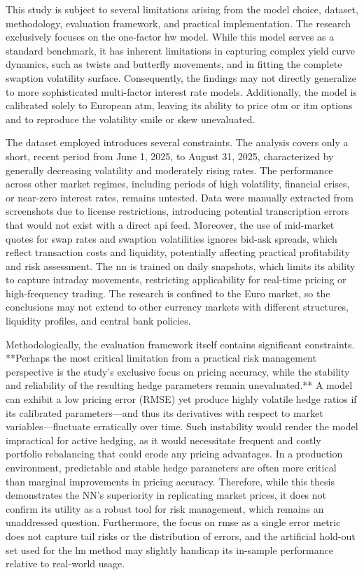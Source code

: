 This study is subject to several limitations arising from the model choice, dataset, methodology, evaluation framework, and practical implementation. The research exclusively focuses on the one-factor \ac{hw} model. While this model serves as a standard benchmark, it has inherent limitations in capturing complex yield curve dynamics, such as twists and butterfly movements, and in fitting the complete swaption volatility surface. Consequently, the findings may not directly generalize to more sophisticated multi-factor interest rate models. Additionally, the model is calibrated solely to European \ac{atm}, leaving its ability to price \ac{otm} or \ac{itm} options and to reproduce the volatility smile or skew unevaluated.

The dataset employed introduces several constraints. The analysis covers only a short, recent period from June 1, 2025, to August 31, 2025, characterized by generally decreasing volatility and moderately rising rates. The performance across other market regimes, including periods of high volatility, financial crises, or near-zero interest rates, remains untested. Data were manually extracted from screenshots due to license restrictions, introducing potential transcription errors that would not exist with a direct \ac{api} feed. Moreover, the use of mid-market quotes for swap rates and swaption volatilities ignores bid-ask spreads, which reflect transaction costs and liquidity, potentially affecting practical profitability and risk assessment. The \ac{nn} is trained on daily snapshots, which limits its ability to capture intraday movements, restricting applicability for real-time pricing or high-frequency trading. The research is confined to the Euro market, so the conclusions may not extend to other currency markets with different structures, liquidity profiles, and central bank policies.

Methodologically, the evaluation framework itself contains significant constraints. **Perhaps the most critical limitation from a practical risk management perspective is the study's exclusive focus on pricing accuracy, while the stability and reliability of the resulting hedge parameters remain unevaluated.** A model can exhibit a low pricing error (RMSE) yet produce highly volatile hedge ratios if its calibrated parameters—and thus its derivatives with respect to market variables—fluctuate erratically over time. Such instability would render the model impractical for active hedging, as it would necessitate frequent and costly portfolio rebalancing that could erode any pricing advantages. In a production environment, predictable and stable hedge parameters are often more critical than marginal improvements in pricing accuracy. Therefore, while this thesis demonstrates the NN's superiority in replicating market prices, it does not confirm its utility as a robust tool for risk management, which remains an unaddressed question. Furthermore, the focus on \ac{rmse} as a single error metric does not capture tail risks or the distribution of errors, and the artificial hold-out set used for the \ac{lm} method may slightly handicap its in-sample performance relative to real-world usage.

